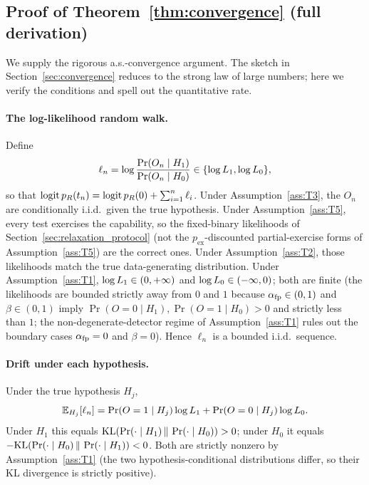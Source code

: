 \subsection{Proof of Theorem~\ref{thm:convergence} (full
derivation)}
\label{app:proof_convergence}

We supply the rigorous a.s.-convergence argument.  The sketch
in Section~\ref{sec:convergence} reduces to the strong law of
large numbers; here we verify the conditions and spell out the
quantitative rate.

\paragraph{The log-likelihood random walk.}
Define
$$
\ell_n = \log \frac{\Pr(O_n \mid H_1)}{\Pr(O_n \mid H_0)}
  \in \{\log L_1, \log L_0\},
$$
so that
$\operatorname{logit} p_R(t_n) = \operatorname{logit} p_R(0) + \sum_{i=1}^n \ell_i$.
Under Assumption~\ref{ass:T3}, the $O_n$ are conditionally
i.i.d.\ given the true hypothesis.  Under
Assumption~\ref{ass:T5}, every test exercises the capability,
so the fixed-binary likelihoods of
Section~\ref{sec:relaxation_protocol} (not the
$p_{\mathrm{ex}}$-discounted partial-exercise forms of
Assumption~\ref{ass:T5}) are the correct ones.  Under
Assumption~\ref{ass:T2}, those likelihoods match the true
data-generating distribution.  Under
Assumption~\ref{ass:T1}, $\log L_1 \in (0, +\infty)$ and
$\log L_0 \in (-\infty, 0)$; both are finite (the
likelihoods are bounded strictly away from $0$ and $1$ because
$\alpha_{\mathrm{fp}} \in (0, 1)$ and $\beta \in (0, 1)$ imply
$\Pr(O = 0 \mid H_1), \Pr(O = 1 \mid H_0) > 0$ and strictly
less than $1$; the non-degenerate-detector regime of
Assumption~\ref{ass:T1} rules out the boundary cases
$\alpha_{\mathrm{fp}} = 0$ and $\beta = 0$).  Hence $\ell_n$ is a bounded
i.i.d.\ sequence.

\paragraph{Drift under each hypothesis.}
Under the true hypothesis $H_j$,
$$
\mathbb{E}_{H_j}[\ell_n]
   = \Pr(O = 1 \mid H_j) \log L_1
     + \Pr(O = 0 \mid H_j) \log L_0.
$$
Under $H_1$ this equals
$\mathrm{KL}(\Pr(\cdot \mid H_1) \,\|\, \Pr(\cdot \mid H_0)) > 0$;
under $H_0$ it equals
$-\mathrm{KL}(\Pr(\cdot \mid H_0) \,\|\, \Pr(\cdot \mid H_1)) < 0$.
Both are strictly nonzero by Assumption~\ref{ass:T1} (the
two hypothesis-conditional distributions differ, so their KL
divergence is strictly positive).

